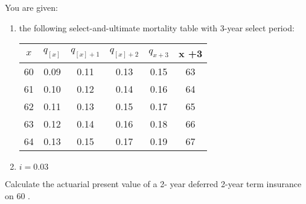 You are given:
\begin{enumerate}
\item the following select-and-ultimate mortality table with 3-year select period:
\begin{center}\begin{tabular}{cccccc}
$x$ & $q_{[x]}$ & $q_{[x] +1}$ & $q_{[x] +2}$ & $q_{x+3}$ &  x +3 \\ \hline
60 & 0.09 & 0.11 & 0.13 & 0.15 & 63 \\
61 & 0.10 & 0.12 & 0.14 & 0.16 & 64  \\
62 & 0.11 & 0.13 & 0.15 & 0.17 & 65 \\ 
63 & 0.12 & 0.14 & 0.16 & 0.18 & 66 \\ 
64 & 0.13 & 0.15 & 0.17 & 0.19 & 67
\end{tabular}\end{center}
\item $i = 0.03$
\end{enumerate}
Calculate %
the actuarial present value of a 2- year deferred 2-year term insurance
on 60 .





